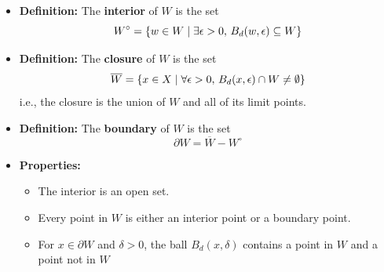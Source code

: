 \documentclass[11pt,twoside]{report}
\newcommand{\Interior}[1]{\ensuremath{{#1}^{\circ}}}
\newcommand{\Closure}[1]{\ensuremath{\overline{#1}}}
\begin{document}
\begin{itemize}

\item \textbf{Definition:} The  \textbf{interior} of $W$ is the set 
\[
\Interior{W} = \{ w \in W \mid \exists \eps > 0, \, B_d(w, \eps) \subseteq W\} 
\]

\item \textbf{Definition:} The  \textbf{closure} of $W$ is the set 
\[
\Closure{W} = \{ x\in X \mid \forall \eps > 0, \,  B_d(x,\eps) \cap W \ne \emptyset \} 
\]
i.e., the closure is the union of $W$ and all of its limit points. 

\item \textbf{Definition:} The  \textbf{boundary} of $W$ is the set 
\[
\partial W = \Closure{W} - \Interior{W}
\]


%


\item \textbf{Properties:} 

\begin{itemize}
\item The interior is an open set. 
\item Every point in $W$ is either an interior point or a boundary point. 
\item  For $x \in \partial W$ and  $\delta>0$, the ball $B_d (x,\delta)$ contains a point in $W$ and a point not in $W$

\end{itemize}


\end{itemize}
\end{document}
